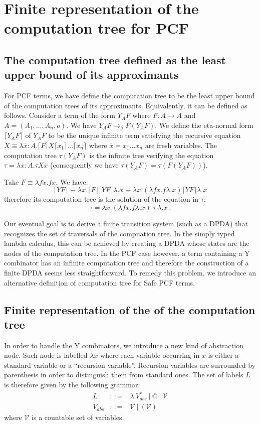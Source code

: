 \documentclass{article}
\newcommand{\aux}[1]{\lceil #1\rceil}
\newcommand{\betared}{\rightarrow_\beta}
\newcommand{\syneq}{\equiv}
\begin{document}
\section{Finite representation of the computation tree for PCF}

\subsection{The computation tree defined as the least upper bound of its approximants}
For PCF terms, we have define the computation tree to be the least upper bound of the computation trees of its approximants. Equivalently, it can be defined as follows. Consider a term of the form $Y_A F$ where $F:A\rightarrow A$ and $A = (A_1,\ldots,A_n,o)$.
We have $Y_A F \betared F (Y_A F)$.
We define the eta-normal form $\aux{Y_A F}$ of $Y_A F$ to be the unique infinite term satisfying the recursive equation $X \syneq \lambda \overline{x}: \overline{A} . \aux{F} X \aux{x_1} \ldots \aux{x_n} $
where $\overline{x} = x_1 \ldots x_n$ are fresh variables.
The computation tree $\tau(Y_A F)$ is the infinite tree verifying the equation 
$\tau =  \lambda \overline{x}: \overline{A} . \tau X \overline{x}$ (consequently we have $\tau(Y_A F) = \tau(F (Y_A F))$).

Take $F \syneq \lambda f x. f x$. We have:
$$\aux{Y F} \syneq \lambda x . \aux{F} \aux{Y F} \lambda.x \syneq \lambda x. (\lambda f x. f \lambda.x ) \aux{Y F} \lambda.x$$ therefore its computation tree is the solution of the equation in $\tau$: $$\tau = \lambda x . (\lambda f x. f \lambda.x) \ \tau \ \lambda.x \ .$$


Our eventual goal is to derive a finite transition system (such as a DPDA) that recognizes the set of traversals of the compuation tree. In the simply typed lambda calculus, this can be achieved by creating a DPDA whose states are the nodes of the computation tree.
In the PCF case however, a term containing a Y combinator has an infinite computation tree and therefore the construction of a finite DPDA seems less straightforward.
To remedy this problem, we introduce an alternative definition of computation tree for Safe PCF terms.

\subsection{Finite representation of the of the computation tree}

In order to handle the Y combinators, we introduce a new kind of abstraction node. Such node is labelled $\lambda \overline{x}$ where each variable occurring in $\overline{x}$ is either a standard variable or a ``recursion variable''.
Recursion variables are surrounded by parenthesis in order to distinguish them from standard ones. The set of labels $L$ is therefore given by the following grammar:
\begin{eqnarray*}
L &::=& \lambda\ V_{abs}^*\ |\ @\ |\ \mathcal{V} \\
V_{abs} &::=& \mathcal{V}\ |\ (\mathcal{V})
\end{eqnarray*}
where $\mathcal{V}$ is a countable set of variables.
\end{document}
